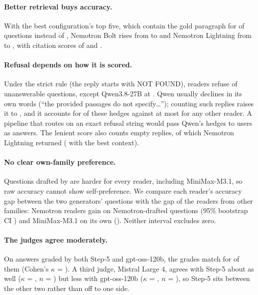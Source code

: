 \documentclass[11pt]{article}
\begin{document}
\paragraph{Better retrieval buys accuracy.} With the best configuration's top five, which contain the gold paragraph for \CtxBestRfive{} of questions instead of \CtxRfive{}, Nemotron Bolt rises from \BoltAcc{} to \BoltAccBest{} and Nemotron Lightning from \LightAcc{} to \LightAccBest{}, with citation scores of \BoltCiteBest{} and \LightCiteBest{}.

\paragraph{Refusal depends on how it is scored.} Under the strict rule (the reply starts with NOT FOUND), readers refuse \OtherUnStrictRange{} of unanswerable questions, except Qwen3.8-27B at \QwenUnStrict{}. Qwen usually declines in its own words (``the provided passages do not specify\ldots''); counting such replies raises it to \QwenUnSoft{}, and it accounts for \FailHedgeQwen{} of these hedges against at most \FailHedgeOtherMax{} for any other reader. A pipeline that routes on an exact refusal string would pass Qwen's hedges to users as answers. The lenient score also counts empty replies, of which Nemotron Lightning returned \LightEmpty{} (\LightEmptyBest{} with the best context).

\paragraph{No clear own-family preference.} Questions drafted by \GenB{} are harder for every reader, including MiniMax-M3.1, so raw accuracy cannot show self-preference. We compare each reader's accuracy gap between the two generators' questions with the gap of the readers from other families: Nemotron readers gain \PrefNem{} on Nemotron-drafted questions (95\% bootstrap CI \PrefNemCI{}) and MiniMax-M3.1 \PrefMM{} on its own (\PrefMMCI{}). Neither interval excludes zero.

\paragraph{The judges agree moderately.} On \JudgeN{} answers graded by both Step-5 and gpt-oss-120b, the grades match for \JudgeExact{} of them (Cohen's $\kappa$ = \JudgeKappa{}). A third judge, Mistral Large 4, agrees with Step-5 about as well ($\kappa$ = \JudgeThreeKappa{}, $n$ = \JudgeThreeN{}) but less with gpt-oss-120b ($\kappa$ = \JudgeOthersKappa{}, $n$ = \JudgeOthersN{}), so Step-5 sits between the other two rather than off to one side.
\end{document}
